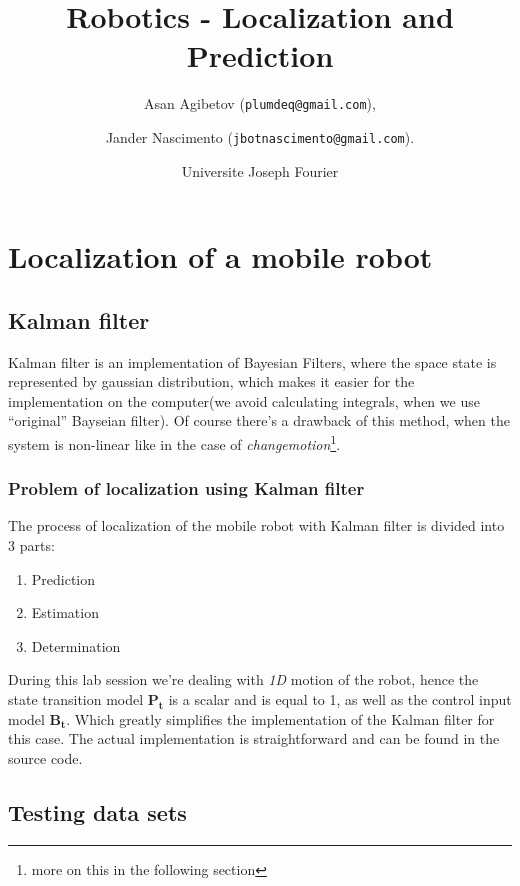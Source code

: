 \documentclass{article}
\begin{document}
\title{Robotics - Localization and Prediction}

\author{Asan Agibetov (\texttt{plumdeq@gmail.com}), 
\and Jander Nascimento (\texttt{jbotnascimento@gmail.com}).
\and Universite Joseph Fourier}

\maketitle

\section{Localization of a mobile robot}

\subsection{Kalman filter}
Kalman filter is an implementation of Bayesian Filters, where the space state is represented by gaussian distribution, which makes it easier for the implementation on the computer(we avoid calculating integrals, when we use ``original'' Bayseian filter). Of course there's a drawback of this method, when the system is non-linear like in the case of \textit{changemotion}\footnote{more on this in the following section}.
\subsubsection{Problem of localization using Kalman filter}
The process of localization of the mobile robot with Kalman filter is divided into 3 parts:

\begin{enumerate}
\item Prediction
\item Estimation
\item Determination
\end{enumerate}

During this lab session we're dealing with \textit{1D} motion of the robot, hence the state transition model $\mathbf{P_t}$ is a scalar and is equal to 1, as well as the control input model $\mathbf{B_t}$. Which greatly simplifies the implementation of the Kalman filter for this case. The actual implementation is straightforward and can be found in the source code.
\subsection{Testing data sets}
\end{document}
